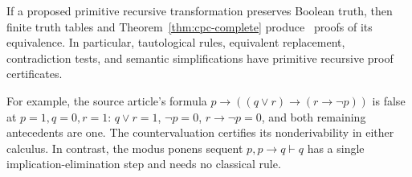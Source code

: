 \begin{corollary}\label{thm:cpc-rebuild}
If a proposed primitive recursive transformation preserves Boolean truth,
then finite truth tables and Theorem~\ref{thm:cpc-complete} produce \CPC\
proofs of its equivalence. In particular, tautological rules, equivalent
replacement, contradiction tests, and semantic simplifications have
primitive recursive proof certificates.
\end{corollary}

For example, the source article's formula
$p\to((q\vee r)\to(r\to\neg p))$ is false at $p=1,q=0,r=1$:
$q\vee r=1$, $\neg p=0$, $r\to\neg p=0$, and both remaining antecedents
are one. The countervaluation certifies its nonderivability in either
calculus. In contrast, the modus ponens sequent $p,p\to q\vdash q$ has a
single implication-elimination step and needs no classical rule.
